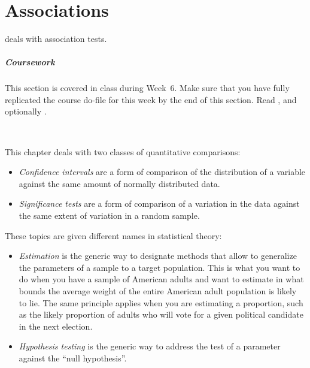%
%
\chapter{Associations}%
	\label{ch:asso}%
  \begin{mybox}
     deals with association tests.%
  
    \paragraph{Coursework} %
    This section is covered in class during Week~6. Make sure that you have fully replicated the course do-file for this week by the end of this section. Read  \citeauthor[ch.~9 and 14]{Urdan:2010a}, and optionally \citeauthor[ch.~6--7]{FeinsteinThomas:2002d}.%
  \end{mybox}\\[4em]%
  \startcontents[chapters]%
	\newpage

This chapter deals with two classes of quantitative comparisons:

\begin{itemize}
  \item \emph{Confidence intervals} are a form of comparison of the distribution of a variable against the same amount of normally distributed data. %
  \item \emph{Significance tests} are a form of comparison of a variation in the data against the same extent of variation in a random sample. %
\end{itemize}

These topics are given different names in statistical theory:

\begin{itemize}
  \item \emph{Estimation} is the generic way to designate methods that allow to generalize the parameters of a sample to a target population. This is what you want to do when you have a sample of American adults and want to estimate in what bounds the average weight of the entire American adult population is likely to lie. The same principle applies when you are estimating a proportion, such as the likely proportion of adults who will vote for a given political candidate in the next election. %
  \item \emph{Hypothesis testing} is the generic way to address the test of a parameter against the ``null hypothesis''.
\end{itemize}

